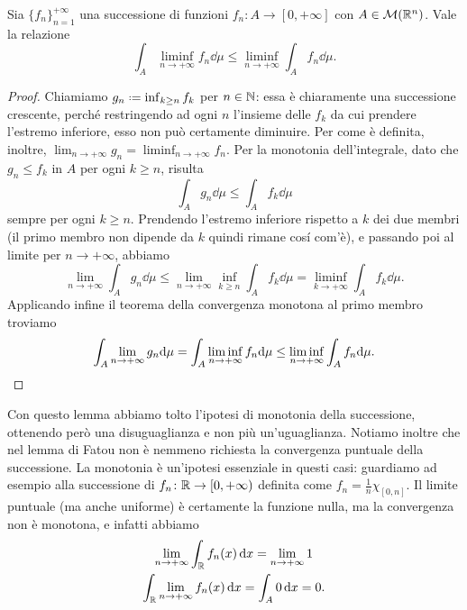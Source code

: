 \begin{lemma} \label{l:fatou}
	Sia $\{f_n\}_{n=1}^{+\infty}$ una successione di funzioni $f_n\colon A\to[0,+\infty]$ con $A\in\mathcal M(\mathbb{R}^n)$.
	Vale la relazione
	\begin{equation}
		\int_A\liminf_{n\to+\infty}f_n\dd\mu\leq\liminf_{n\to+\infty}\int_Af_n\dd\mu.
		\label{eq:fatou}
	\end{equation}
\end{lemma}
\begin{proof}
	Chiamiamo $g_n\defeq\inf_{k\geq n}f_k$ per $n\in\mathbb{N}$: essa è chiaramente una successione crescente, perch\'e restringendo ad ogni $n$ l'insieme delle $f_k$ da cui prendere l'estremo inferiore, esso non può certamente diminuire.
	Per come è definita, inoltre, $\lim_{n\to+\infty}g_n=\liminf_{n\to+\infty}f_n$.
	Per la monotonia dell'integrale, dato che $g_n\leq f_k$ in $A$ per ogni $k\geq n$, risulta
	\begin{equation}
		\int_Ag_n\dd\mu\leq\int_Af_k\dd\mu
	\end{equation}
	sempre per ogni $k\geq n$.
	Prendendo l'estremo inferiore rispetto a $k$ dei due membri (il primo membro non dipende da $k$ quindi rimane cos\'i com'è), e passando poi al limite per $n\to+\infty$, abbiamo
	\begin{equation}
		\lim_{n\to+\infty}\int_Ag_n\dd\mu\leq\lim_{n\to+\infty}\inf_{k\geq n}\int_Af_k\dd\mu=\liminf_{k\to+\infty}\int_Af_k\dd\mu.
	\end{equation}
	Applicando infine il teorema della convergenza monotona al primo membro troviamo
	\begin{equation}
		\int_A\lim_{n\to+\infty}g_n\textup{d}\mu=\int_A\liminf_{n\to+\infty}f_n\textup{d}\mu\leq\liminf_{n\to+\infty}\int_Af_n\textup{d}\mu.\qedhere
	\end{equation}
\end{proof}
Con questo lemma abbiamo tolto l'ipotesi di monotonia della successione, ottenendo però una disuguaglianza e non più un'uguaglianza.
Notiamo inoltre che nel lemma di Fatou non è nemmeno richiesta la convergenza puntuale della successione.
La monotonia è un'ipotesi essenziale in questi casi: guardiamo ad esempio alla successione di $f_n\colon\mathbb{R}\to[0,+\infty)$ definita come $f_n=\frac1{n}\chi_{[0,n]}$.
Il limite puntuale (ma anche uniforme) è certamente la funzione nulla, ma la convergenza non è monotona, e infatti abbiamo
\begin{gather*}
	\lim_{n\to+\infty}\int_{\mathbb{R}}f_n(x)\,\textup{d} x=\lim_{n\to+\infty}1\\
	\int_{\mathbb{R}}\lim_{n\to+\infty}f_n(x)\,\textup{d} x=\int_A0\,\textup{d} x=0.
\end{gather*}

